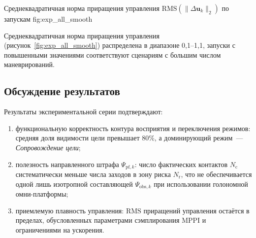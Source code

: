 {Среднеквадратичная норма приращения управления
$\mathrm{RMS}(\|\Delta\mathbf{u}_k\|_2)$ по запускам}
{fig:exp_all_smooth}

Среднеквадратичная норма приращения управления
(рисунок~\ref{fig:exp_all_smooth}) распределена в диапазоне
0{,}1--1{,}1, запуски с повышенными значениями соответствуют
сценариям с большим числом маневрирований.

\subsection{Обсуждение результатов}

Результаты экспериментальной серии подтверждают:
\begin{enumerate}
    \item функциональную корректность контура восприятия и
          переключения режимов: средняя доля видимости цели
          превышает 80\%, а доминирующий режим~---
          \textit{Сопровождение цели};
    \item полезность направленного штрафа $\Psi_{\text{pf},k}$:
          число фактических контактов $N_{\text{c}}$ систематически
          меньше числа заходов в зону риска $N_{\text{r}}$, что не
          обеспечивается одной лишь изотропной составляющей
          $\Psi_{\text{obs},k}$ при использовании голономной
          омни-платформы;
    \item приемлемую плавность управления: $\mathrm{RMS}$ приращений
          управления остаётся в пределах, обусловленных параметрами
          сэмплирования MPPI и ограничениями на ускорения.
\end{enumerate}